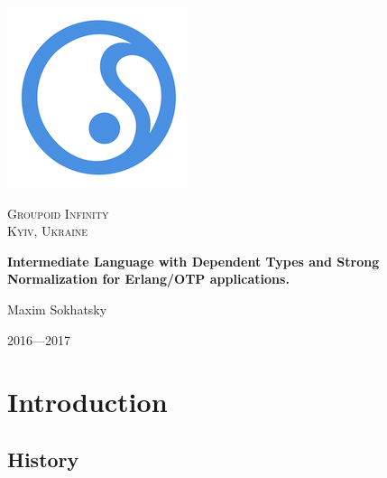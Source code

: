 \documentclass[11pt,oneside]{article}
\begin{document}
\thispagestyle{empty}
\begin{center}

\begin{minipage}[t]{2cm}
    \includegraphics[scale=0.4]{img/S}
\end{minipage}
\begin{minipage}[t]{12cm}
    \begin{flushright}
        \textsc{{\Large Groupoid Infinity}}\\
        \textsc{Kyiv, Ukraine}\\
    \end{flushright}
\end{minipage}

\vspace{3cm}
\vspace{3cm}   {\Large \bf Intermediate Language with Dependent Types and Strong Normalization for Erlang/OTP applications.\\}\par
\vspace{0.3cm} {\Large Maxim Sokhatsky\par}
\vspace{4cm}   {\Large 2016---2017}

\end{center}

\newpage
\vspace{2cm}
\tableofcontents

\newpage
\section{Introduction}

\vspace{1cm}

\subsection{History}
\end{document}
